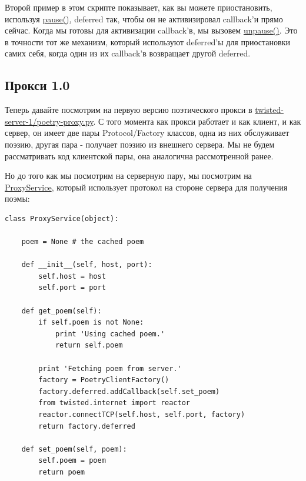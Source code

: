 Второй пример в этом скрипте показывает, как вы можете 
приостановить, используя  
\href{http://twistedmatrix.com/trac/browser/tags/releases/twisted-8.2.0/twisted/internet/defer.py#L272}{pause()}, deferred так, чтобы он не активизировал 
callback'и прямо сейчас. Когда мы готовы для 
активизации callback'в, мы вызовем 
\href{http://twistedmatrix.com/trac/browser/tags/releases/twisted-8.2.0/twisted/internet/defer.py#L278}{unpause()}. Это в точности тот же механизм, который 
используют deferred'ы для приостановки 
самих себя, когда один из их callback'в возвращает другой deferred. 

\subsection{Прокси 1.0}

Теперь давайте посмотрим на первую версию 
поэтического прокси в 
\href{http://github.com/jdavisp3/twisted-intro/blob/master/twisted-server-1/poetry-proxy.py#L1}{twisted-server-1/poetry-proxy.py}. С того момента как 
прокси работает и как клиент, и как сервер, он имеет две 
пары Protocol/Factory классов, одна из них обслуживает 
поэзию, другая пара - получает поэзию из внешнего сервера. 
Мы не будем рассматривать код клиентской пары, она аналогична 
рассмотренной ранее.

Но до того как мы посмотрим на серверную пару, мы посмотрим 
на \href{http://github.com/jdavisp3/twisted-intro/blob/master/twisted-server-1/poetry-proxy.py#L100}{ProxyService}, который использует протокол на стороне 
сервера для получения поэмы:

\begin{scriptsize}\begin{verbatim}
class ProxyService(object):

    poem = None # the cached poem

    def __init__(self, host, port):
        self.host = host
        self.port = port

    def get_poem(self):
        if self.poem is not None:
            print 'Using cached poem.'
            return self.poem

        print 'Fetching poem from server.'
        factory = PoetryClientFactory()
        factory.deferred.addCallback(self.set_poem)
        from twisted.internet import reactor
        reactor.connectTCP(self.host, self.port, factory)
        return factory.deferred

    def set_poem(self, poem):
        self.poem = poem
        return poem
\end{verbatim}\end{scriptsize}


